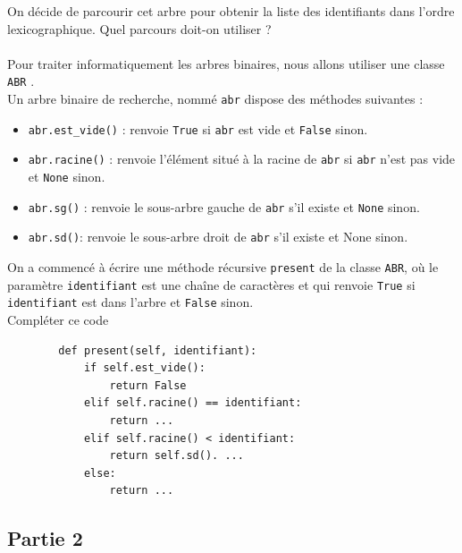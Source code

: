 \documentclass[a4paper,12pt,eval,firamath]{nsi}
\begin{document}
\question On décide de parcourir cet arbre pour obtenir la liste des identifiants dans l'ordre
lexicographique. Quel parcours doit-on utiliser ?\\

\\

Pour traiter informatiquement les arbres binaires, nous allons utiliser une classe
\texttt{ABR} .\\
Un arbre binaire de recherche, nommé \texttt{abr}  dispose des méthodes suivantes :
\begin{itemize}
      \item \texttt{abr.est_vide()} : renvoie \texttt{True}  si \texttt{abr} est vide et \texttt{False} sinon.
      \item \texttt{abr.racine()} : renvoie l'élément situé à la racine de \texttt{abr}  si \texttt{abr} n'est pas vide et \texttt{None} sinon.
      \item \texttt{abr.sg()} : renvoie le sous-arbre gauche de \texttt{abr}  s'il existe et \texttt{None} sinon.
      \item \texttt{abr.sd()}: renvoie le sous-arbre droit de \texttt{abr} s'il existe et None sinon.
\end{itemize}

On a commencé à écrire une méthode récursive \texttt{present}  de la classe \texttt{ABR}, où le paramètre \texttt{identifiant}  est une chaîne de caractères et qui renvoie \texttt{True}  si \texttt{identifiant} est dans l'arbre et \texttt{False} sinon.\\

\question Compléter ce code
\begin{pyc}
      \begin{verbatim}
        def present(self, identifiant):
            if self.est_vide():
                return False
            elif self.racine() == identifiant:
                return ...
            elif self.racine() < identifiant:
                return self.sd(). ...
            else:
                return ...
    \end{verbatim}
\end{pyc}
\subsection*{Partie 2}
\end{document}
